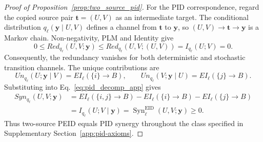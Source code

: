 {\begin{proof}[Proof of Proposition~\ref{prop:two_source_pid}]
For the PID correspondence, regard the copied source pair $\boldsymbol{t}=(U,V)$ as an intermediate target. The conditional distribution $q_\ell(\boldsymbol{y}\mid U,V)$ defines a channel from $\boldsymbol{t}$ to $\boldsymbol{y}$, so $(U,V)\rightarrow\boldsymbol{t}\rightarrow\boldsymbol{y}$ is a Markov chain. Non-negativity, PLM and Identity give
\begin{equation}
0\leq Red_{q_\ell}(U,V;\boldsymbol{y})
\leq Red_{q_\ell}(U,V;(U,V))
=I_{q_\ell}(U;V)=0.
\label{eq:supp_redundancy_zero}
\end{equation}
Consequently, the redundancy vanishes for both deterministic and stochastic transition channels. The unique contributions are
\begin{equation}
Un_{q_\ell}(U;\boldsymbol{y}\mid V)=EI_\ell(\{i\}\rightarrow B),
\qquad
Un_{q_\ell}(V;\boldsymbol{y}\mid U)=EI_\ell(\{j\}\rightarrow B).
\label{eq:supp_unique_information}
\end{equation}
Substituting into Eq.~\eqref{eq:pid_decomp_app} gives
\begin{align}
Syn_{q_\ell}(U,V;\boldsymbol{y})
&=EI_\ell(\{i,j\}\rightarrow B)-EI_\ell(\{i\}\rightarrow B)-EI_\ell(\{j\}\rightarrow B)\nonumber\\
&=I_{q_\ell}(U;V\mid\boldsymbol{y})
=\operatorname{Syn}^{\mathrm{EID}}_\ell(U,V;\boldsymbol{y})\geq0.
\label{eq:supp_two_source_synergy}
\end{align}
Thus two-source PEID equals PID synergy throughout the class specified in Supplementary Section~\ref{app:pid-axioms}.
\end{proof}
}

